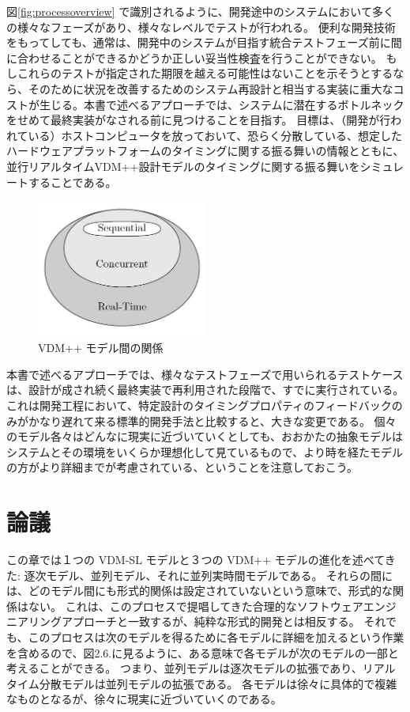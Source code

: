 \documentclass[\pformat,12pt]{jreport}
\begin{document}
図\ref{fig:processoverview} で識別されるように、開発途中のシステムにおいて多くの様々なフェーズがあり、様々なレベルでテストが行われる。
便利な開発技術をもってしても、通常は、開発中のシステムが目指す統合テストフェーズ前に間に合わせることができるかどうか正しい妥当性検査を行うことができない。
もしこれらのテストが指定された期限を越える可能性はないことを示そうとするなら、そのために状況を改善するためのシステム再設計と相当する実装に重大なコストが生じる。本書で述べるアプローチでは、システムに潜在するボトルネックをせめて最終実装がなされる前に見つけることを目指す。
目標は、（開発が行われている）ホストコンピュータを放っておいて、恐らく分散している、想定したハードウェアプラットフォームのタイミングに関する振る舞いの情報とともに、並行リアルタイムVDM++設計モデルのタイミングに関する振る舞いをシミュレートすることである。

\begin{figure}
\begin{center}
\includegraphics[width=0.5\textwidth]{VDM++levelsofmodels}
\end{center}
\caption{VDM++ モデル間の関係}\label{fig:relationship}
\end{figure}

本書で述べるアプローチでは、様々なテストフェーズで用いられるテストケースは、設計が成され続く最終実装で再利用された段階で、すでに実行されている。
これは開発工程において、特定設計のタイミングプロパティのフィードバックのみがかなり遅れて来る標準的開発手法と比較すると、大きな変更である。
個々のモデル各々はどんなに現実に近づいていくとしても、おおかたの抽象モデルはシステムとその環境をいくらか理想化して見ているもので、より時を経たモデルの方がより詳細までが考慮されている、ということを注意しておこう。

\section{論議}

この章では１つの VDM-SL モデルと３つの VDM++ モデルの進化を述べてきた: 逐次モデル、並列モデル、それに並列実時間モデルである。
それらの間には、どのモデル間にも形式的関係は設定されていないという意味で、形式的な関係はない。
これは、このプロセスで提唱してきた合理的なソフトウェアエンジニアリングアプローチと一致するが、純粋な形式的開発とは相反する。
それでも、このプロセスは次のモデルを得るために各モデルに詳細を加えるという作業を含めるので、図2.6.に見るように、ある意味で各モデルが次のモデルの一部と考えることができる。
つまり、並列モデルは逐次モデルの拡張であり、リアルタイム分散モデルは並列モデルの拡張である。
各モデルは徐々に具体的で複雑なものとなるが、徐々に現実に近づいていくのである。
\end{document}
